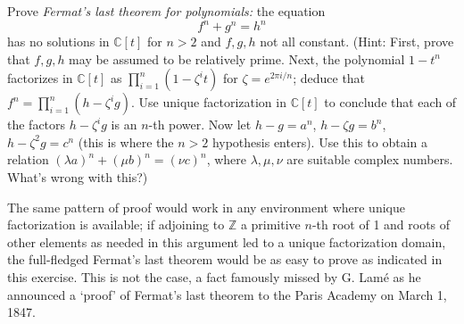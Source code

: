 \documentclass[../../master.tex]{subfiles}
\begin{document}
    \begin{problem}
        Prove \textit{Fermat's last theorem for polynomials:} the equation
        \[
        f^{n} + g^{n} = h^{n}
        \] 
        has no solutions in $\mathbb{C}[t]$ for $n > 2$ and $f, g, h$ not all
        constant. (Hint: First, prove that $f, g, h$ may be assumed to be
        relatively prime. Next, the polynomial $1 - t^{n}$ factorizes in
        $\mathbb{C}[t]$ as $\prod_{i = 1}^{n} (1 - \zeta^{i}t)$ for $\zeta =
        e^{2\pi i/ n}$; deduce that $f^{n} = \prod_{i=1}^{n} (h - \zeta^{i}g)$.
        Use unique factorization in $\mathbb{C}[t]$ to conclude that each of the
        factors $h - \zeta^{i}g$ is an $n$-th power. Now let $h - g = a^{n}$, $h
        - \zeta g = b^{n}$, $h - \zeta^2 g = c^{n}$ (this is where the $n > 2$
        hypothesis enters). Use this to obtain a relation $(\lambda a)^{n} +
        (\mu b)^{n} = (\nu c)^{n}$, where $\lambda, \mu, \nu$ are suitable
        complex numbers. What's wrong with this?)

        The same pattern of proof would work in any environment where unique
        factorization is available; if adjoining to $\mathbb{Z}$ a primitive
        $n$-th root of 1 and roots of other elements as needed in this argument
        led to a unique factorization domain, the full-fledged Fermat's last
        theorem would be as easy to prove as indicated in this exercise. This is
        not the case, a fact famously missed by G. Lam\'e as he announced a
        `proof' of Fermat's last theorem to the Paris Academy on March 1, 1847.
    \end{problem}
\end{document}
